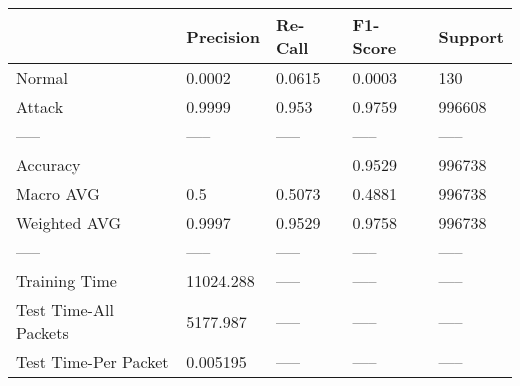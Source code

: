 \begin{tabular}{lllll}
\toprule
{} &  Precision & Re-Call & F1-Score & Support \\
\midrule
Normal                &     0.0002 &  0.0615 &   0.0003 &     130 \\
Attack                &     0.9999 &   0.953 &   0.9759 &  996608 \\
-----                 &      ----- &   ----- &    ----- &   ----- \\
Accuracy              &            &         &   0.9529 &  996738 \\
Macro AVG             &        0.5 &  0.5073 &   0.4881 &  996738 \\
Weighted AVG          &     0.9997 &  0.9529 &   0.9758 &  996738 \\
-----                 &      ----- &   ----- &    ----- &   ----- \\
Training Time         &  11024.288 &   ----- &    ----- &   ----- \\
Test Time-All Packets &   5177.987 &   ----- &    ----- &   ----- \\
Test Time-Per Packet  &   0.005195 &   ----- &    ----- &   ----- \\
\bottomrule
\end{tabular}
